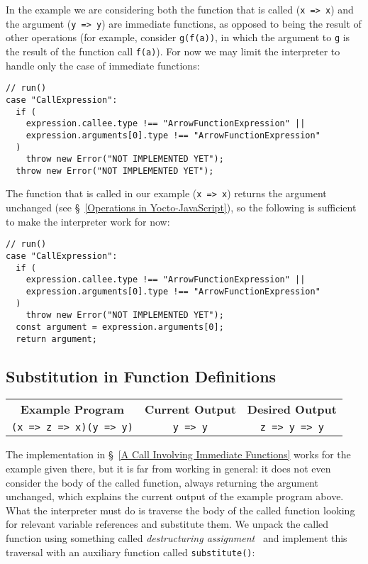 \documentclass[12pt, oneside]{book}
\begin{document}
In the example we are considering both the function that is called (\texttt{x => x}) and the argument (\texttt{y => y}) are immediate functions, as opposed to being the result of other operations (for example, consider \texttt{g(f(a))}, in which the argument to \texttt{g} is the result of the function call \texttt{f(a)}). For now we may limit the interpreter to handle only the case of immediate functions:

\begin{verbatim}
// run()
case "CallExpression":
  if (
    expression.callee.type !== "ArrowFunctionExpression" ||
    expression.arguments[0].type !== "ArrowFunctionExpression"
  )
    throw new Error("NOT IMPLEMENTED YET");
  throw new Error("NOT IMPLEMENTED YET");
\end{verbatim}

The function that is called in our example (\texttt{x => x}) returns the argument unchanged (see §~\ref{Operations in Yocto-JavaScript}), so the following is sufficient to make the interpreter work for now:

\begin{verbatim}
// run()
case "CallExpression":
  if (
    expression.callee.type !== "ArrowFunctionExpression" ||
    expression.arguments[0].type !== "ArrowFunctionExpression"
  )
    throw new Error("NOT IMPLEMENTED YET");
  const argument = expression.arguments[0];
  return argument;
\end{verbatim}

\subsection{Substitution in Function Definitions}
\label{Substitution in Function Definitions}

\begin{center}
\begin{tabular}{c|c|c}
\textbf{Example Program} & \textbf{Current Output} & \textbf{Desired Output} \\
\texttt{(x => z => x)(y => y)} & \texttt{y => y} & \texttt{z => y => y} \\
\end{tabular}
\end{center}

\noindent The implementation in §~\ref{A Call Involving Immediate Functions} works for the example given there, but it is far from working in general: it does not even consider the body of the called function, always returning the argument unchanged, which explains the current output of the example program above. What the interpreter must do is traverse the body of the called function looking for relevant variable references and substitute them. We unpack the called function using something called \emph{destructuring assignment}~\cite{destructuring-assignment} and implement this traversal with an auxiliary function called \texttt{substitute()}:
\end{document}
